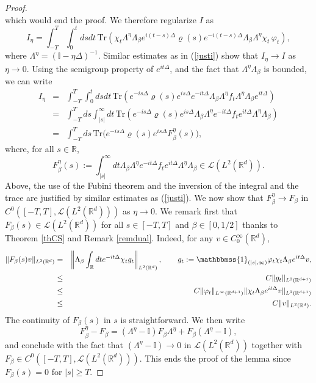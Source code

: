 \documentclass[12pt]{article}
\def \Rm {\mathbb R}
\def\II{\mathbb{I}}
\newcommand{\calL}{\mathcal L}
\newcommand{\Tr}{\textrm{Tr}}
\def\fref#1{{\rm (\ref{#1})}}
\def\un{{\mathbbmss{1}}}
\newcommand{\bee}{\begin{eqnarray*}}
\newcommand{\eee}{\end{eqnarray*}}
\begin{document}
\begin{proof}
$$$$
which would end the proof. We therefore regularize $I$ as
$$
I_\eta=\int_{-T}^T \int_0^tds dt\, \Tr \left( \chi_t \Lambda^\eta \Lambda_{\beta} e^{i(t- s) \Delta} \varrho(s)e^{-i (t-s) \Delta }\Lambda_{\beta} \Lambda^\eta \chi_t \, \varphi_t  \right),
$$
where $\Lambda^\eta=(\II-\eta \Delta)^{-1}$. Similar estimates as in \fref{justi} show that $I_\eta \to I$ as $\eta \to 0$. Using the semigroup property of $e^{it \Delta}$, and the fact that $\Lambda^\eta \Lambda_\beta$ is bounded, we can write
\bee
I_\eta &=&\int_{-T}^T  \int_0^t ds dt\, \Tr \left(e^{-i s \Delta} \varrho(s) e^{is \Delta } e^{-i t \Delta}\Lambda_{\beta} \Lambda^\eta f_t \Lambda^\eta \Lambda_{\beta} e^{i t \Delta}\right) \\
&=&\int_{-T}^T ds  \int_{|s|}^\infty  dt \,\Tr \left(e^{-i s \Delta} \varrho(s) e^{is \Delta } \Lambda_{\beta} \Lambda^\eta e^{-i t \Delta} f_t e^{i t \Delta}  \Lambda^\eta \Lambda_{\beta} \right)\\
&=&\int_{-T}^T ds\, \Tr \big(  e^{-i s \Delta} \varrho(s) e^{is \Delta} F^\eta_\beta(s) \big),
\eee
where, for all $s\in \Rm$, 
$$
F^\eta_\beta(s):=\int_{|s|}^\infty dt  \Lambda_{\beta}\Lambda^\eta e^{-i t \Delta }f_t e^{i t \Delta } \Lambda^\eta \Lambda_{\beta}\in \calL(L^2(\Rm^d)).
$$
Above, the use of the Fubini theorem and the inversion of the integral and the trace are justified by similar estimates as \fref{justi}. We now show that $F^\eta_\beta \to F_\beta$ in $C^0([-T,T],\calL(L^2(\Rm^d)))$ as $\eta \to 0$. We remark first that $F_\beta(s) \in \calL(L^2(\Rm^d))$ for all $s \in [-T,T]$ and $\beta \in [0,1/2]$ thanks to Theorem \ref{thCS} and Remark \ref{remdual}. Indeed, for any $v \in C_0^\infty(\Rm^d)$,
\bee
\| F_\beta(s) v \|_{L^2(\Rm^d)}&=&\left\| \Lambda_{\beta} \int_\Rm dt  e^{-i t \Delta } \chi_t g_t \right\|_{L^2(\Rm^d)}, \qquad g_t:=\un_{(|s|,\infty)} \varphi_t \chi_t  \Lambda_{\beta}  e^{i t \Delta } v,\\
&\leq & C \|g_t \|_{L^2(\Rm^{d+1})}\\
& \leq & C  \|\varphi_t\|_{L^\infty(\Rm^{d+1})} \|\chi_t  \Lambda_{\beta}  e^{i t \Delta } v\|_{L^2(\Rm^{d+1})}\\
&\leq & C \|v\|_{L^2(\Rm^d)}.
\eee
The continuity of $F_\beta(s)$ in  $s$ is straightforward. We then write
$$
F_\beta^\eta-F_\beta=(\Lambda^\eta-\II) F_\beta  \Lambda^\eta+F_\beta  (\Lambda^\eta-\II),
$$
and conclude with the fact that $(\Lambda^\eta-\II)\to 0$ in $\calL(L^2(\Rm^{d}))$ together with $F_\beta \in C^0([-T,T],\calL(L^2(\Rm^d)))$. This ends the proof of the lemma since $F_\beta(s)=0$ for $|s| \geq T$.
\end{proof}
\end{document}
